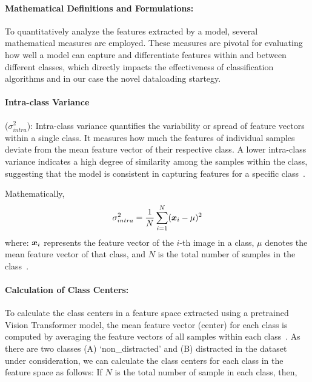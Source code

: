 \paragraph{Mathematical Definitions and Formulations:}
To quantitatively analyze the features extracted by a model, several mathematical measures are employed. These measures are pivotal for evaluating how well a model can capture and differentiate features within and between different classes, which directly impacts the effectiveness of classification algorithms and in our case the novel dataloading startegy.

\paragraph{Intra-class Variance} (\(\sigma_{intra}^2\)):
Intra-class variance quantifies the variability or spread of feature vectors within a single class. It measures how much the features of individual samples deviate from the mean feature vector of their respective class. A lower intra-class variance indicates a high degree of similarity among the samples within the class, suggesting that the model is consistent in capturing features for a specific class~\citep{intra_class_var_pilarczyk2019intra}.

Mathematically,
\begin{equation}
\begin{aligned}
\sigma_{intra}^2 = \frac{1}{N} \sum_{i=1}^N ({\bm{x}}_i - \mu)^2
\end{aligned}
\label{equation:4.8}
\end{equation}
where: \( {\bm{x}}_i \) represents the feature vector of the \(i\)-th image in a class, \( \mu \) denotes the mean feature vector of that class, and \( N \) is the total number of samples in the class~\citep{intra_class_var_pilarczyk2019intra}.

\paragraph{Calculation of Class Centers:}
To calculate the class centers in a feature space extracted using a pretrained Vision Transformer model, the mean feature vector (center) for each class is computed by averaging the feature vectors of all samples within each class~\citep{intra_class_var_pilarczyk2019intra}. As there are two classes (A) `non\_distracted' and (B) distracted in the dataset under consideration, we can calculate the class centers for each class in the feature space as follows: 
If $\displaystyle N$ is the total number of sample in each class, then,

